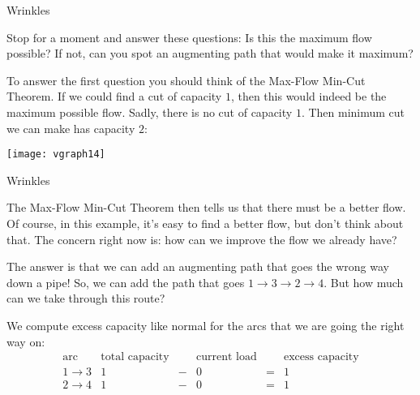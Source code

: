 \begin{frame}[fragile]{Wrinkles}

Stop for a moment and answer these questions: Is this the maximum flow possible?  If not, can you spot an augmenting path that would make it maximum?

To answer the first question you should think of the Max-Flow Min-Cut Theorem.  If we could find a cut of capacity $1$, then this would indeed be the maximum possible flow.  Sadly, there is no cut of capacity $1$.  Then minimum cut we can make has capacity $2$:

\begin{center}
\texttt{[image: vgraph14]}
\end{center}



\end{frame}
\begin{frame}[fragile]{Wrinkles}

The Max-Flow Min-Cut Theorem then tells us that there must be a better flow.  Of course, in this example, it's easy to find a better flow, but don't think about that.  The concern right now is: how can we improve the flow we already have?

The answer is that we can add an augmenting path that goes the wrong way down a pipe!  So, we can add the path that goes $1\rightarrow 3\rightarrow 2\rightarrow 4$.  But how much can we take through this route?

We compute excess capacity like normal for the arcs that we are going the right way on:
$$
\begin{array}{r|ccccc}
\mbox{arc}&\mbox{total capacity}&&\mbox{current load}&&\mbox{excess capacity}\\
\hline
1\rightarrow 3&1&-&0&=&1\\
2\rightarrow 4&1&-&0&=&1
\end{array}
$$

\end{frame}
